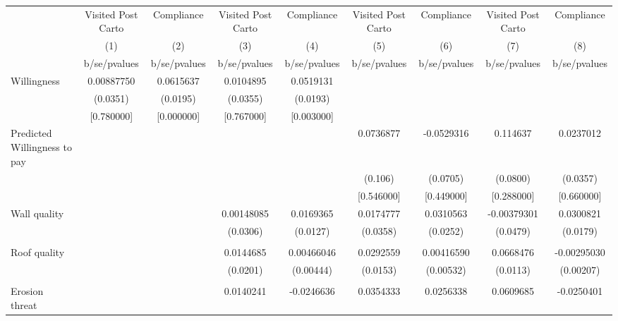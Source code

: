 {
\def\sym#1{\ifmmode^{#1}\else\(^{#1}\)\fi}
\begin{tabular}{l*{8}{c}}
\toprule
                &\multicolumn{1}{c}{Visited Post Carto}&\multicolumn{1}{c}{Compliance}&\multicolumn{1}{c}{Visited Post Carto}&\multicolumn{1}{c}{Compliance}&\multicolumn{1}{c}{Visited Post Carto}&\multicolumn{1}{c}{Compliance}&\multicolumn{1}{c}{Visited Post Carto}&\multicolumn{1}{c}{Compliance}\\
                &\multicolumn{1}{c}{(1)}&\multicolumn{1}{c}{(2)}&\multicolumn{1}{c}{(3)}&\multicolumn{1}{c}{(4)}&\multicolumn{1}{c}{(5)}&\multicolumn{1}{c}{(6)}&\multicolumn{1}{c}{(7)}&\multicolumn{1}{c}{(8)}\\
                &b/se/pvalues&b/se/pvalues&b/se/pvalues&b/se/pvalues&b/se/pvalues&b/se/pvalues&b/se/pvalues&b/se/pvalues\\
\midrule
Willingness     &0.00887750&0.0615637&0.0104895&0.0519131&         &         &         &         \\
                & (0.0351)& (0.0195)& (0.0355)& (0.0193)&         &         &         &         \\
                &[0.780000]&[0.000000]&[0.767000]&[0.003000]&         &         &         &         \\
Predicted Willingness to pay&         &         &         &         &0.0736877&-0.0529316& 0.114637&0.0237012\\
                &         &         &         &         &  (0.106)& (0.0705)& (0.0800)& (0.0357)\\
                &         &         &         &         &[0.546000]&[0.449000]&[0.288000]&[0.660000]\\
Wall quality    &         &         &0.00148085&0.0169365&0.0174777&0.0310563&-0.00379301&0.0300821\\
                &         &         & (0.0306)& (0.0127)& (0.0358)& (0.0252)& (0.0479)& (0.0179)\\
                &         &         &         &         &         &         &         &         \\
Roof quality    &         &         &0.0144685&0.00466046&0.0292559&0.00416590&0.0668476&-0.00295030\\
                &         &         & (0.0201)&(0.00444)& (0.0153)&(0.00532)& (0.0113)&(0.00207)\\
                &         &         &         &         &         &         &         &         \\
Erosion threat  &         &         &0.0140241&-0.0246636&0.0354333&0.0256338&0.0609685&-0.0250401\\

\end{tabular}}
